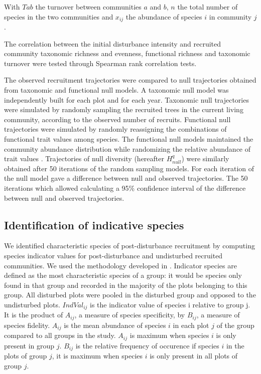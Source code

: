 \documentclass[fleqn,10pt]{ArtEcoFoG} %
\begin{document}
With \(Tab\) the turnover between communities \(a\) and \(b\), \(n\) the total number of species in the two communities and \(x_{ij}\) the abundance of species \(i\) in community \(j\).

The correlation between the initial disturbance intensity and recruited community taxonomic richness and evenness, functional richness and taxonomic turnover were tested through Spearman rank correlation tests.
\color{black}

The observed recruitment trajectories were compared to null trajectories obtained from taxonomic and functional null models.
A taxonomic null model was independently built for each plot and for each year.
Taxonomic null trajectories were simulated by randomly sampling the recruited trees in the current living community, according to the observed number of recruits.
Functional null trajectories were simulated by randomly reassigning the combinations of functional trait values among species.
The functional null models maintained the community abundance distribution while randomizing the relative abundance of trait values \citep{Mason2013}.
Trajectories of null diversity (hereafter \(H^q_{null}\)) were similarly obtained after 50 iterations of the random sampling models.
For each iteration of the null model gave a difference between null and observed trajectories.
The 50 iterations which allowed calculating a 95\% confidence interval of the difference between null and observed trajectories.

\color{red}

\hypertarget{identification-of-indicative-species}{%
\subsection{Identification of indicative species}\label{identification-of-indicative-species}}

We identified characteristic species of post-disturbance recruitment by computing species indicator values for post-disturbance and undisturbed recruited communities.
We used the methodology developed in \citet{Dufrene1997}.
Indicator species are defined as the most characteristic species of a group: it would be species only found in that group and recorded in the majority of the plots belonging to this group.
All disturbed plots were pooled in the disturbed group and opposed to the undisturbed plots.
\(IndVal_{ij}\) is the indicator value of species i relative to group j.
It is the product of \(A_{ij}\), a measure of species specificity, by \(B_{ij}\), a measure of species fidelity.
\(A_{ij}\) is the mean abundance of species \(i\) in each plot \(j\) of the group compared to all groups in the study. \(A_{ij}\) is maximum when species \(i\) is only present in group \(j\).
\(B_{ij}\) is the relative frequency of occurence if species \(i\) in the plots of group \(j\), it is maximum when species \(i\) is only present in all plots of group \(j\).
\end{document}
